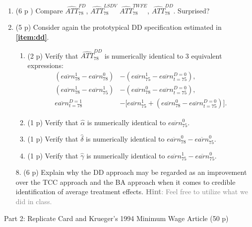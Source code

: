 \documentclass{article}
\begin{document}
\begin{enumerate}[label=\textbf{Q\arabic{enumi}}.,ref=Q\arabic{enumi}, wide=0pt, itemsep=0em, topsep=5pt, labelindent=0pt]
\item (6 p ) Compare $\widehat{ATT}_{78}^{FD}$, $\widehat{ATT}_{78}^{LSDV}$ $\widehat{ATT}_{78}^{TWFE}$, $\widehat{ATT}_{78}^{DD}$. Surprised?


\item (5 p) Consider again the prototypical DD specification estimated in \textbf{\ref{item:dd}}.

\begin{enumerate}
\item (2 p) Verify that $\widehat{ATT}_{78}^{DD}$ is numerically identical to 3 equivalent expressions:\label{item:DinD-diff} 
\begin{align}
\left( \overline{earn}_{78}^{1}-\overline{earn}_{78}^{0}\right) &-\left( \overline{earn}_{75}^{1}-\overline{earn}_{t=75}^{D=0}\right),\label{eq:DDv1} \\
\left( \overline{earn}_{78}^{1} -\overline{earn}_{75}^{1}\right) &-\left( \overline{earn}_{78}^{0}-\overline{earn}_{t=75}^{D=0}\right),\label{eq:DDv2} \\ 
\overline{earn}_{t=78}^{D=1} &- \big[ \overline{earn}_{75}^{1}+ \left( \overline{earn}_{78}^{0}-\overline{earn}_{t=75}^{D=0}\right) \big].\label{eq:DDv3}
\end{align}
\item (1 p) Verify that $\hat{\alpha}$ is numerically identical to $\overline{earn}_{75}^{0}$.
\item (1 p) Verify that $\hat{\delta}$ is numerically identical to $\overline{earn}_{78}^{0}-\overline{earn}_{75}^{0}$.
\item (1 p) Verify that $\hat{\gamma}$ is numerically identical to $\overline{earn}_{75}^{1}-\overline{earn}_{75}^{0}$.
\end{enumerate}

8. (6 p) Explain why the DD approach may be regarded as an improvement over the TCC approach and the BA approach when it comes to credible identification of average treatment effects. \textcolor{gray}{\textbf{Hint}: Feel free to utilize what we did in class.}
\end{enumerate}

\begin{center}
{\LARGE Part 2: Replicate Card and Krueger's 1994 Minimum Wage Article (50 p)}
\end{center}
\end{document}
